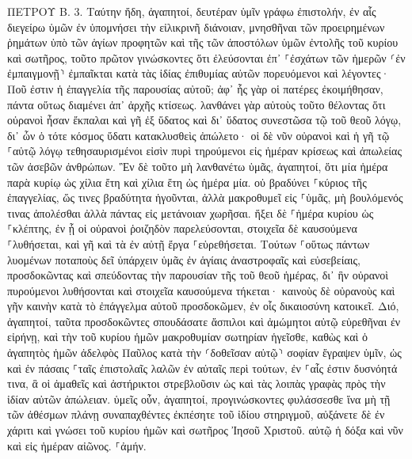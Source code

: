 \documentclass[twoside, 9pt]{extreport}
\begin{document}
ΠΕΤΡΟΥ Β.
3.
Ταύτην ἤδη, ἀγαπητοί, δευτέραν ὑμῖν γράφω ἐπιστολήν, ἐν αἷς διεγείρω ὑμῶν ἐν ὑπομνήσει τὴν εἰλικρινῆ διάνοιαν, 
μνησθῆναι τῶν προειρημένων ῥημάτων ὑπὸ τῶν ἁγίων προφητῶν καὶ τῆς τῶν ἀποστόλων ὑμῶν ἐντολῆς τοῦ κυρίου καὶ σωτῆρος, 
τοῦτο πρῶτον γινώσκοντες ὅτι ἐλεύσονται ἐπ᾽ ⸀ἐσχάτων τῶν ἡμερῶν ⸂ἐν ἐμπαιγμονῇ⸃ ἐμπαῖκται κατὰ τὰς ἰδίας ἐπιθυμίας αὐτῶν πορευόμενοι 
καὶ λέγοντες· Ποῦ ἐστιν ἡ ἐπαγγελία τῆς παρουσίας αὐτοῦ; ἀφ᾽ ἧς γὰρ οἱ πατέρες ἐκοιμήθησαν, πάντα οὕτως διαμένει ἀπ᾽ ἀρχῆς κτίσεως. 
λανθάνει γὰρ αὐτοὺς τοῦτο θέλοντας ὅτι οὐρανοὶ ἦσαν ἔκπαλαι καὶ γῆ ἐξ ὕδατος καὶ δι᾽ ὕδατος συνεστῶσα τῷ τοῦ θεοῦ λόγῳ, 
δι᾽ ὧν ὁ τότε κόσμος ὕδατι κατακλυσθεὶς ἀπώλετο· 
οἱ δὲ νῦν οὐρανοὶ καὶ ἡ γῆ τῷ ⸀αὐτῷ λόγῳ τεθησαυρισμένοι εἰσὶν πυρὶ τηρούμενοι εἰς ἡμέραν κρίσεως καὶ ἀπωλείας τῶν ἀσεβῶν ἀνθρώπων. 
Ἓν δὲ τοῦτο μὴ λανθανέτω ὑμᾶς, ἀγαπητοί, ὅτι μία ἡμέρα παρὰ κυρίῳ ὡς χίλια ἔτη καὶ χίλια ἔτη ὡς ἡμέρα μία. 
οὐ βραδύνει ⸀κύριος τῆς ἐπαγγελίας, ὥς τινες βραδύτητα ἡγοῦνται, ἀλλὰ μακροθυμεῖ εἰς ⸀ὑμᾶς, μὴ βουλόμενός τινας ἀπολέσθαι ἀλλὰ πάντας εἰς μετάνοιαν χωρῆσαι. 
ἥξει δὲ ⸀ἡμέρα κυρίου ὡς ⸀κλέπτης, ἐν ᾗ οἱ οὐρανοὶ ῥοιζηδὸν παρελεύσονται, στοιχεῖα δὲ καυσούμενα ⸀λυθήσεται, καὶ γῆ καὶ τὰ ἐν αὐτῇ ἔργα ⸀εὑρεθήσεται. 
Τούτων ⸀οὕτως πάντων λυομένων ποταποὺς δεῖ ὑπάρχειν ὑμᾶς ἐν ἁγίαις ἀναστροφαῖς καὶ εὐσεβείαις, 
προσδοκῶντας καὶ σπεύδοντας τὴν παρουσίαν τῆς τοῦ θεοῦ ἡμέρας, δι᾽ ἣν οὐρανοὶ πυρούμενοι λυθήσονται καὶ στοιχεῖα καυσούμενα τήκεται· 
καινοὺς δὲ οὐρανοὺς καὶ γῆν καινὴν κατὰ τὸ ἐπάγγελμα αὐτοῦ προσδοκῶμεν, ἐν οἷς δικαιοσύνη κατοικεῖ. 
Διό, ἀγαπητοί, ταῦτα προσδοκῶντες σπουδάσατε ἄσπιλοι καὶ ἀμώμητοι αὐτῷ εὑρεθῆναι ἐν εἰρήνῃ, 
καὶ τὴν τοῦ κυρίου ἡμῶν μακροθυμίαν σωτηρίαν ἡγεῖσθε, καθὼς καὶ ὁ ἀγαπητὸς ἡμῶν ἀδελφὸς Παῦλος κατὰ τὴν ⸂δοθεῖσαν αὐτῷ⸃ σοφίαν ἔγραψεν ὑμῖν, 
ὡς καὶ ἐν πάσαις ⸀ταῖς ἐπιστολαῖς λαλῶν ἐν αὐταῖς περὶ τούτων, ἐν ⸀αἷς ἐστιν δυσνόητά τινα, ἃ οἱ ἀμαθεῖς καὶ ἀστήρικτοι στρεβλοῦσιν ὡς καὶ τὰς λοιπὰς γραφὰς πρὸς τὴν ἰδίαν αὐτῶν ἀπώλειαν. 
ὑμεῖς οὖν, ἀγαπητοί, προγινώσκοντες φυλάσσεσθε ἵνα μὴ τῇ τῶν ἀθέσμων πλάνῃ συναπαχθέντες ἐκπέσητε τοῦ ἰδίου στηριγμοῦ, 
αὐξάνετε δὲ ἐν χάριτι καὶ γνώσει τοῦ κυρίου ἡμῶν καὶ σωτῆρος Ἰησοῦ Χριστοῦ. αὐτῷ ἡ δόξα καὶ νῦν καὶ εἰς ἡμέραν αἰῶνος. ⸀ἀμήν. 
\end{document}
